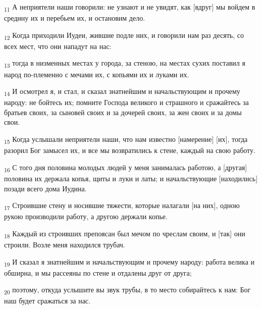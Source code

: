 \begin{tcolorbox}
\textsubscript{11} А неприятели наши говорили: не узнают и не увидят, как [вдруг] мы войдем в средину их и перебьем их, и остановим дело.
\end{tcolorbox}
\begin{tcolorbox}
\textsubscript{12} Когда приходили Иудеи, жившие подле них, и говорили нам раз десять, со всех мест, что они нападут на нас:
\end{tcolorbox}
\begin{tcolorbox}
\textsubscript{13} тогда в низменных местах у города, за стеною, на местах сухих поставил я народ по-племенно с мечами их, с копьями их и луками их.
\end{tcolorbox}
\begin{tcolorbox}
\textsubscript{14} И осмотрел я, и стал, и сказал знатнейшим и начальствующим и прочему народу: не бойтесь их; помните Господа великого и страшного и сражайтесь за братьев своих, за сыновей своих и за дочерей своих, за жен своих и за домы свои.
\end{tcolorbox}
\begin{tcolorbox}
\textsubscript{15} Когда услышали неприятели наши, что нам известно [намерение] [их], тогда разорил Бог замысел их, и все мы возвратились к стене, каждый на свою работу.
\end{tcolorbox}
\begin{tcolorbox}
\textsubscript{16} С того дня половина молодых людей у меня занималась работою, а [другая] половина их держала копья, щиты и луки и латы; и начальствующие [находились] позади всего дома Иудина.
\end{tcolorbox}
\begin{tcolorbox}
\textsubscript{17} Строившие стену и носившие тяжести, которые налагали [на них], одною рукою производили работу, а другою держали копье.
\end{tcolorbox}
\begin{tcolorbox}
\textsubscript{18} Каждый из строивших препоясан был мечом по чреслам своим, и [так] они строили. Возле меня находился трубач.
\end{tcolorbox}
\begin{tcolorbox}
\textsubscript{19} И сказал я знатнейшим и начальствующим и прочему народу: работа велика и обширна, и мы рассеяны по стене и отдалены друг от друга;
\end{tcolorbox}
\begin{tcolorbox}
\textsubscript{20} поэтому, откуда услышите вы звук трубы, в то место собирайтесь к нам: Бог наш будет сражаться за нас.
\end{tcolorbox}
